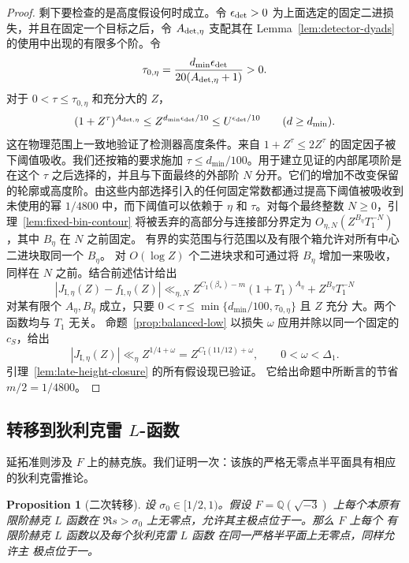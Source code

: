 \documentclass[11pt,a4paper]{article}
\numberwithin{equation}{section}
\numberwithin{figure}{section}
\newtheorem{proposition}[theorem]{Proposition}
\theoremstyle{definition}
\theoremstyle{remark}
\begin{document}
\begin{proof}
剩下要检查的是高度假设何时成立。令
$\epsilon_{\rm det}>0$ 为上面选定的固定二进损失，并且在固定一个目标之后，令 $A_{{\rm det},\eta}$ 支配其在 Lemma~\ref{lem:detector-dyads} 的使用中出现的有限多个阶。令
\[
 \tau_{0,\eta}
 =\frac{d_{\min}\epsilon_{\rm det}}
        {20(A_{{\rm det},\eta}+1)}>0.
\]
对于 $0<\tau\le\tau_{0,\eta}$ 和充分大的 $Z$，
\[
 (1+Z^\tau)^{A_{{\rm det},\eta}}
 \le Z^{d_{\min}\epsilon_{\rm det}/10}
 \le U^{\epsilon_{\rm det}/10}
 \qquad(d\ge d_{\min}).
\]
这在物理范围上一致地验证了检测器高度条件。来自 $1+Z^\tau\le2Z^\tau$ 的固定因子被下阈值吸收。我们还按箱的要求施加 $\tau\le d_{\min}/100$。用于建立见证的内部尾项阶是在这个 $\tau$ 之后选择的，并且与下面最终的外部阶 $N$ 分开。它们的增加不改变保留的轮廓或高度阶。由这些内部选择引入的任何固定常数都通过提高下阈值被吸收到未使用的幂 $1/4800$ 中，而下阈值可以依赖于 $\eta$ 和 $\tau$。对每个最终整数 $N\ge0$，引理~\ref{lem:fixed-bin-contour} 将被丢弃的高部分与连接部分界定为
$O_{\eta,N}(Z^{B_\eta}T_1^{-N})$，其中 $B_\eta$ 在 $N$ 之前固定。
有界的实范围与行范围以及有限个箱允许对所有中心二进块取同一个
$B_\eta$。
对 $O(\log Z)$ 个二进块求和可通过将 $B_\eta$ 增加一来吸收，
同样在 $N$ 之前。结合前述估计给出
\[
 |J_{\mathrm I,\eta}(Z)-f_{\mathrm I,\eta}(Z)|
 \ll_{\eta,N}Z^{C_{\mathrm I}(\beta_*)-m}(1+T_1)^{A_\eta}
       +Z^{B_\eta}T_1^{-N}
\]
对某有限个 $A_\eta,B_\eta$ 成立，只要
$0<\tau\le\min\{d_{\min}/100,\tau_{0,\eta}\}$ 且 $Z$ 充分
大。两个函数均与 $T_1$ 无关。
命题~\ref{prop:balanced-low} 以损失 $\omega$ 应用并除以同一个固定的 $c_S$，给出
\[
 |J_{\mathrm I,\eta}(Z)|\ll_\eta
 Z^{1/4+\omega}=Z^{C_{\mathrm I}(11/12)+\omega},
 \qquad 0<\omega<\Delta_1.
\]
引理~\ref{lem:late-height-closure} 的所有假设现已验证。
它给出命题中所断言的节省 $m/2=1/4800$。
\end{proof}

\subsection{转移到狄利克雷 \texorpdfstring{$L$-函数}{L-functions}}

延拓准则涉及 $F$ 上的赫克族。我们证明一次：该族的严格无零点半平面具有相应的狄利克雷推论。

\begin{proposition}[二次转移]
\label{prop:hecke-dirichlet-transfer}
设 $\sigma_0\in[1/2,1)$。假设 $F=\mathbb Q(\sqrt{-3})$ 上每个本原有限阶赫克
$L$ 函数在
$\Re s>\sigma_0$ 上无零点，允许其主极点位于一。那么 $F$ 上每个
有限阶赫克 $L$ 函数以及每个狄利克雷 $L$ 函数
在同一严格半平面上无零点，同样允许主
极点位于一。
\end{proposition}
\end{document}
